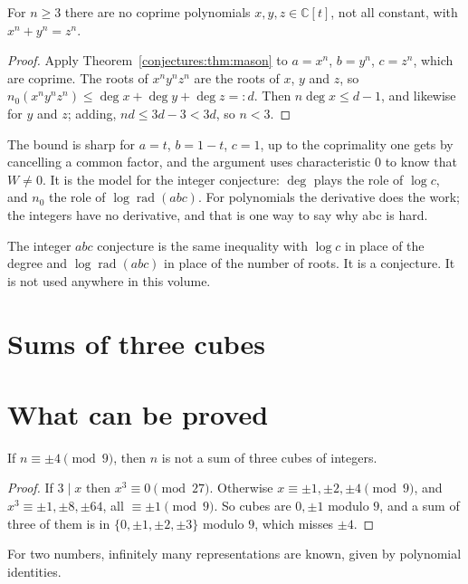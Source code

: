 \begin{corollary}\label{conjectures:cor:fermatpoly}
For $n\ge3$ there are no coprime polynomials $x,y,z\in\mathbb C[t]$, not all constant, with $x^n+y^n=z^n$.
\end{corollary}
\begin{proof}
Apply Theorem~\ref{conjectures:thm:mason} to $a=x^n$, $b=y^n$, $c=z^n$, which are coprime. The roots of $x^ny^nz^n$ are the roots of $x$, $y$ and $z$, so
$n_0(x^ny^nz^n)\le\deg x+\deg y+\deg z=:d$. Then $n\deg x\le d-1$, and likewise for $y$ and $z$; adding, $nd\le3d-3<3d$, so $n<3$.
\end{proof}

The bound is sharp for $a=t$, $b=1-t$, $c=1$, up to the coprimality one gets by cancelling a common factor, and the argument uses characteristic $0$ to know that $W\ne0$. It is the model for the
integer conjecture: $\deg$ plays the role of $\log c$, and $n_0$ the role of $\log\operatorname{rad}(abc)$. For polynomials the derivative does the work; the
integers have no derivative, and that is one way to say why abc is hard.


The integer $abc$ conjecture is the same inequality with $\log c$ in place of the degree and $\log\operatorname{rad}(abc)$ in place of the number of roots. It is a conjecture. It is not used anywhere in this volume.

\section{Sums of three cubes}

\section{What can be proved}

\begin{proposition}\label{prop:mod9}
If $n\equiv\pm4\pmod9$, then $n$ is not a sum of three cubes of integers.
\end{proposition}

\begin{proof}
If $3\mid x$ then $x^3\equiv0\pmod{27}$. Otherwise $x\equiv\pm1,\pm2,\pm4\pmod9$, and $x^3\equiv\pm1,\pm8,\pm64$, all $\equiv\pm1\pmod9$. So cubes are $0,\pm1$ modulo $9$, and a sum of three of them is in
$\{0,\pm1,\pm2,\pm3\}$ modulo $9$, which misses $\pm4$.
\end{proof}

For two numbers, infinitely many representations are known, given by polynomial identities.

